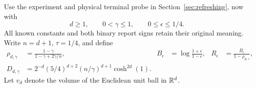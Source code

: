 Use the experiment and physical terminal probe in
Section~\ref{sec:refreshing}, now with
\begin{equation}\label{eq:v2-range}
 d\ge1,\qquad 0<\gamma\le1,\qquad 0\le\epsilon\le1/4.
\end{equation}
All known constants and both binary report signs retain their original
meaning. Write $n=d+1$, $\tau=1/4$, and define
\begin{align}
 \rho_{d,\gamma}&=\frac{1-\gamma}{1-\gamma+2\gamma/n},&
 B_\epsilon&=\log\frac{1+\epsilon}{1-\epsilon},&
 R_\epsilon&=\frac{B_\epsilon}{1-\rho_{d,\gamma}},\label{eq:v2-Hconst}\\
 D_{d,\gamma}&=2^{-d}(5/4)^{d+2}(n/\gamma)^{d+1}\cosh^{2d}(1).
 \label{eq:v2-Dconst}
\end{align}
Let $v_d$ denote the volume of the Euclidean unit ball in $\mathbb R^d$.

